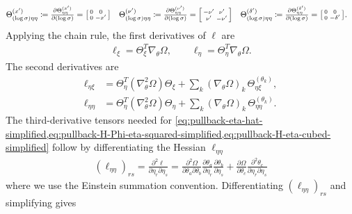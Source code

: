 \documentclass{article}
\begin{document}
\begin{align}
  \Theta_{(\log \sigma)\eta\eta}^{(x')} & \coloneqq \tfrac{\partial \Theta_{\eta\eta}^{(x')}}{\partial (\log \sigma)} = \begin{bsmallmatrix} 0 & 0 \\ 0 & -x' \end{bsmallmatrix} &  & \Theta_{(\log \sigma)\eta\eta}^{(\nu')} \coloneqq \tfrac{\partial \Theta_{\eta\eta}^{(\nu')}}{\partial (\log \sigma)} = \begin{bsmallmatrix} -\nu' & \nu' \\ \nu' & -\nu' \end{bsmallmatrix} &  & \Theta_{(\log \sigma)\eta\eta}^{(\delta')} \coloneqq \tfrac{\partial \Theta_{\eta\eta}^{(\delta')}}{\partial (\log \sigma)} = \begin{bsmallmatrix} 0 & 0 \\ 0 & -\delta' \end{bsmallmatrix}.
\end{align}
%
Applying the chain rule, the first derivatives of $\ell$ are
%
\begin{align}
  \ell_{\xi} = \Theta_{\xi}^{T} \nabla_\theta \Omega,
  \qquad
  \ell_{\eta}   = \Theta_{\eta}^{T} \nabla_\theta \Omega.
\end{align}
%
The second derivatives are
%
\begin{align}
  \ell_{\eta \xi}  & = \Theta_{\eta}^{T} (\nabla_\theta^2 \Omega) \Theta_\xi + \sum_{k} (\nabla_\theta \Omega)_{k} \, \Theta_{\eta\xi}^{(\theta_k)},   \\
  \ell_{\eta \eta} & = \Theta_{\eta}^{T} (\nabla_\theta^2 \Omega) \Theta_\eta + \sum_{k} (\nabla_\theta \Omega)_{k} \, \Theta_{\eta\eta}^{(\theta_k)}.
\end{align}
%
The third-derivative tensors needed for \cref{eq:pullback-eta-hat-simplified,eq:pullback-H-Phi-eta-squared-simplified,eq:pullback-H-eta-cubed-simplified}
follow by differentiating the Hessian $\ell_{\eta\eta}$
%
\begin{align}
  (\ell_{\eta\eta})_{rs}
  = \frac{\partial^2 \ell}{\partial \eta_r \partial \eta_s}
  = \frac{\partial^2 \Omega}{\partial \theta_a \partial \theta_b} \frac{\partial \theta_a}{\partial \eta_r} \frac{\partial \theta_b}{\partial \eta_s}
  + \frac{\partial \Omega}{\partial \theta_c} \frac{\partial^2 \theta_c}{\partial \eta_r \partial \eta_s}
\end{align}
%
where we use the Einstein summation convention.
Differentiating $(\ell_{\eta\eta})_{rs}$ and simplifying gives
%
\end{document}
